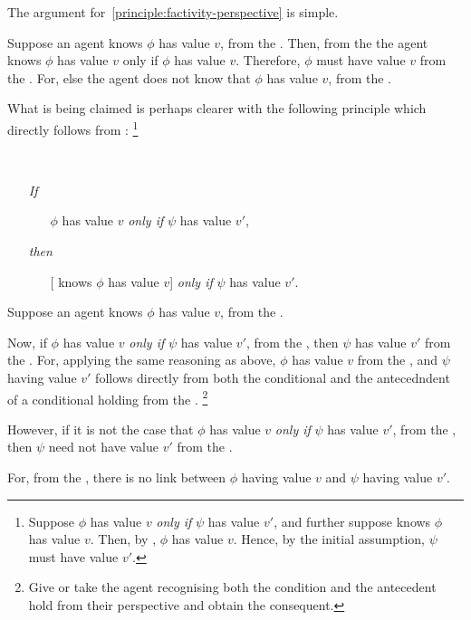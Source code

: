 \begin{note}[Argument]
  The argument for~\autoref{principle:factivity-perspective} is simple.

  Suppose an agent knows \(\phi\) has value \(v\), from the \agpe{}.
  Then, from the \agpe{} the agent knows \(\phi\) has value \(v\) only if \(\phi\) has value \(v\).
  Therefore, \(\phi\) must have value \(v\) from the \agpe{}.
  For, else the agent does not know that \(\phi\) has value \(v\), from the \agpe{}.
\end{note}

\begin{note}[Elaboration]
  What is being claimed is perhaps clearer with the following principle which directly follows from \factivity{}:%
  \footnote{
    Suppose \(\phi\) has value \(v\) \emph{only if} \(\psi\) has value \(v'\), and further suppose \vAgent{} knows \(\phi\) has value \(v\).
    Then, by \factivity{}, \(\phi\) has value \(v\).
    Hence, by the initial assumption, \(\psi\) must have value \(v'\).
  }

  \begin{principle}
    \mbox{ }
    \vspace{-\baselineskip}
    \label{principle:tsf}
    \begin{itemize}[noitemsep]
    \item[\emph{If}]
      \begin{itemize}
      \item[]
        \(\phi\) has value \(v\) \emph{only if} \(\psi\) has value \(v'\),
      \end{itemize}
    \item[\emph{then}]
      \begin{itemize}
      \item[]
        [\vAgent{} knows \(\phi\) has value \(v\)] \emph{only if} \(\psi\) has value \(v'\).
      \end{itemize}
    \end{itemize}
    \vspace{-\baselineskip}
  \end{principle}

  Suppose an agent knows \(\phi\) has value \(v\), from the \agpe{}.

  Now, if \(\phi\) has value \(v\) \emph{only if} \(\psi\) has value \(v'\), from the \agpe{}, then \(\psi\) has value \(v'\) from the \agpe{}.
  For, applying the same reasoning as above, \(\phi\) has value \(v\) from the \agpe{}, and \(\psi\) having value \(v'\) follows directly from both the conditional and the antecedndent of a conditional holding from the \agpe{}.%
  \footnote{
    Give or take the agent recognising both the condition and the antecedent hold from their perspective and obtain the consequent.
  }

  However, if it is not the case that \(\phi\) has value \(v\) \emph{only if} \(\psi\) has value \(v'\), from the \agpe{}, then \(\psi\) need not have value \(v'\) from the \agpe{}.

  For, from the \agpe{}, there is no link between \(\phi\) having value \(v\) and \(\psi\) having value \(v'\).
\end{note}

